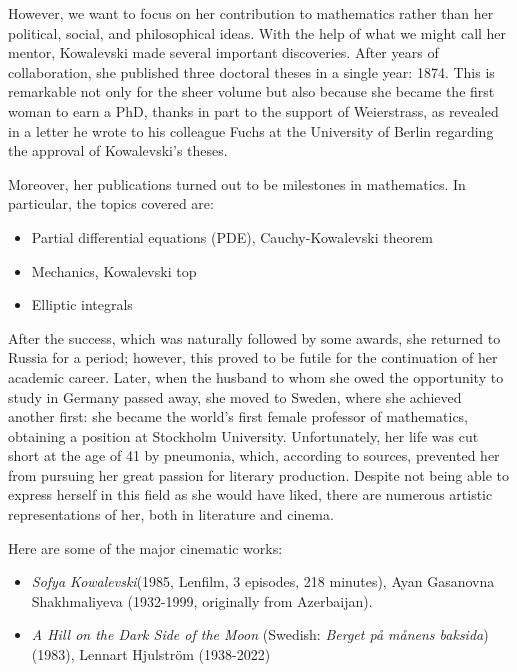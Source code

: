 However, we want to focus on her contribution to mathematics rather than her political, social, and philosophical ideas. With the help of what we might call her mentor, Kowalevski made several important discoveries. After years of collaboration, she published three doctoral theses in a single year: 1874. This is remarkable not only for the sheer volume but also because she became the first woman to earn a PhD, thanks in part to the support of Weierstrass, as revealed in a letter he wrote to his colleague Fuchs at the University of Berlin regarding the approval of Kowalevski's theses. 

Moreover, her publications turned out to be milestones in mathematics. In particular, the topics covered are:
\begin{itemize}
\item Partial differential equations (PDE), Cauchy-Kowalevski theorem
\item Mechanics, Kowalevski top
\item Elliptic integrals
\end{itemize}

After the success, which was naturally followed by some awards, she returned to Russia for a period; however, this proved to be futile for the continuation of her academic career. Later, when the husband to whom she owed the opportunity to study in Germany passed away, she moved to Sweden, where she achieved another first: she became the world's first female professor of mathematics, obtaining a position at Stockholm University.
Unfortunately, her life was cut short at the age of 41 by pneumonia, which, according to sources, prevented her from pursuing her great passion for literary production.
Despite not being able to express herself in this field as she would have liked, there are numerous artistic representations of her, both in literature and cinema.

Here are some of the major cinematic works:
\begin{itemize}
\emergencystretch 3em
\item \textit{Sofya Kowalevski}(1985, Lenfilm, 3 episodes, 218 minutes), Ayan Gasanovna Shakhmaliyeva (1932-1999, originally from Azerbaijan).

\item \textit{A Hill on the Dark Side of the Moon} (Swedish: \textit{Berget på månens baksida})(1983), Lennart Hjulström (1938-2022)
\end{itemize}

